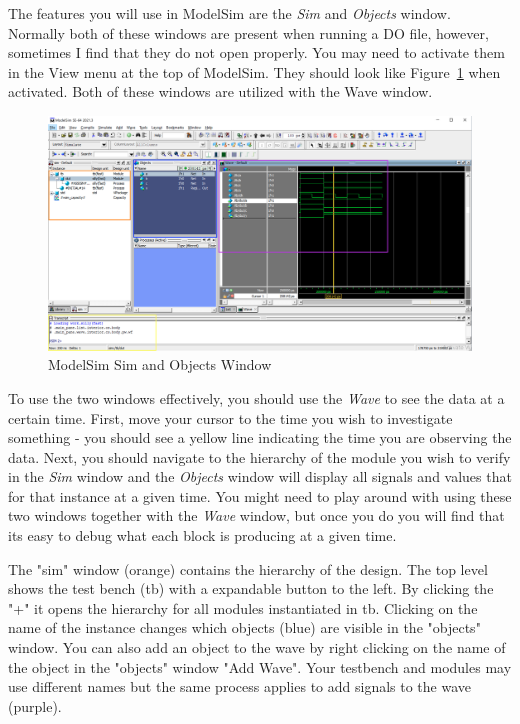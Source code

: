 \documentclass{article}
\begin{document}
The features you will use in ModelSim are the \textit{Sim} and
\textit{Objects} window.  Normally both of these windows are present
when running a DO file, however, sometimes I find that they do not
open properly.  You may need to activate them in the View menu at the
top of ModelSim.  They should look like Figure~\ref{modelsim.png} when
activated.  Both of these windows are utilized with the Wave window.
\begin{figure} [t!]
  \centering
  \includegraphics[scale=0.3]{modelsim.png}
  \caption{ModelSim Sim and Objects Window}
  \label{modelsim.png}
\end{figure}

To use the two windows effectively, you should use the \textit{Wave}
to see the data at a certain time.  First, move your cursor to the
time you wish to investigate something - you should see a yellow line
indicating the time you are observing the data.  Next, you
should navigate to the
hierarchy of the module you wish to verify in the \textit{Sim} window
and the \textit{Objects} window will display all signals and values
that for that instance at a given time.  You might need to play around
with using these two windows together with the \textit{Wave} window,
but once you do you will find that its easy to debug what each block
is producing at a given time.

The "sim" window (orange) contains the hierarchy of the design.  The
top level shows the test bench (tb) with a expandable button to the
left.
By clicking the "+" it opens the hierarchy for all modules
instantiated in tb.  Clicking on the name of the instance changes
which objects (blue) are visible in the "objects" window.  You can
also add an
object to the wave by right clicking on the name of the object in the
"objects" window "Add Wave".  Your testbench and modules may use
different names but the same process applies to add signals to the
wave (purple).
\end{document}
